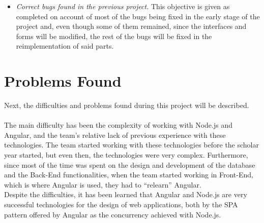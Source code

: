 \documentclass[11pt]{book}
\begin{document}
\begin{itemize}
		\item \emph{Correct bugs found in the previous project.}
		This objective is given as completed on account of most of the bugs being fixed in the early stage of the project and, even though some of them remained, since the interfaces and forms will be modified, the rest of the bugs will be fixed in the reimplementation of said parts.
	\end{itemize}
	
	\section{Problems Found}
	Next, the difficulties and problems found during this project will be described.\\\\
	The main difficulty has been the complexity of working with Node.js and Angular, and the team's relative lack of previous experience with these technologies. The team started working with these technologies before the scholar year started, but even then, the technologies were very complex. Furthermore, since most of the time was spent on the design and development of the database and the Back-End functionalities, when the team started working in Front-End, which is where Angular is used, they had to ``relearn'' Angular.\\
	Despite the difficulties, it has been learned that Angular and Node.js are very successful technologies for the design of web applications, both by the SPA pattern offered by Angular as the concurrency achieved with Node.js.
	
\end{document}
